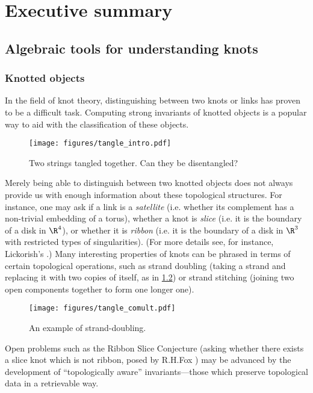 \chapter{Executive summary}
\label{ch:summary}

\section{Algebraic tools for understanding knots}
\subsection{Knotted objects}
In the field of knot theory, distinguishing between two knots or links
has proven to be a difficult task. Computing strong invariants of knotted
objects is a popular way to aid with the classification of these objects.
\begin{figure}[h]
        \centering
        \texttt{[image: figures/tangle\_intro.pdf]}
        \caption{Two strings tangled together. Can they be disentangled?}
        \label{fig:unknot}
\end{figure}

Merely being able to distinguish between two knotted objects does not always
provide us with enough information about these topological structures. For
instance, one may ask if a link is a \emph{satellite} (i.e. whether its
complement has a non-trivial embedding of a torus), whether a knot is
\emph{slice} (i.e. it is the boundary of a disk in $\R^4$), or whether it is
\emph{ribbon} (i.e. it is the boundary of a disk in $\R^3$ with restricted types
of singularities). (For more details see, for instance, Lickorish's
\cite{lickorish}.) Many interesting properties of knots can be phrased in terms
of certain topological operations, such as strand doubling (taking a strand and
replacing it with two copies of itself, as in \cref{fig:strand_double}) or
strand stitching (joining two open components together to form one longer one).

\begin{figure}[h]
        \centering
        \texttt{[image: figures/tangle\_comult.pdf]}
        \caption{An example of strand-doubling.}
        \label{fig:strand_double}
\end{figure}

Open problems such as the Ribbon Slice Conjecture (asking whether there exists a
slice knot which is not ribbon, posed by R.\@ H.\@ Fox \cite{fox}) may be
advanced by the development of \enquote{topologically aware} invariants---those
which preserve topological data in a retrievable way.

